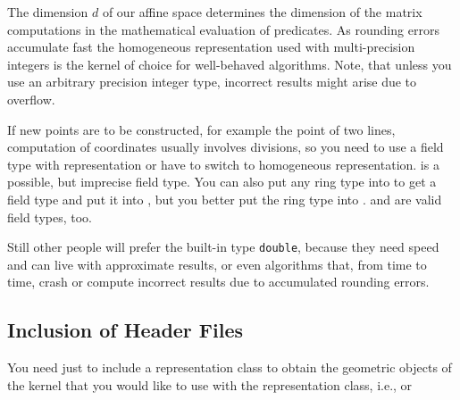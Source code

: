 The dimension $d$ of our affine space determines the dimension of the
matrix computations in the mathematical evaluation of predicates.  As
rounding errors accumulate fast the homogeneous representation used
with multi-precision integers is the kernel of choice for well-behaved
algorithms.  Note, that unless you use an arbitrary precision integer
type, incorrect results might arise due to overflow.

If new points are to be constructed, for example the
 point of two lines, computation of
 coordinates usually involves divisions,
so you need to use a field type with 
representation or have to switch to homogeneous representation.
 is a possible, but imprecise field type.  You can also
put any ring type into  to get a field type and put it
into , but you better put the ring type into
.   and  are valid
field types, too.

Still other people will prefer the built-in type {\tt double}, because
they need speed and can live with approximate results, or even
algorithms that, from time to time, crash or compute incorrect results
due to accumulated rounding errors.

\subsection{Inclusion of Header Files}

You need just to include a representation class to obtain the
geometric objects of the kernel that you would like to use with the
representation class, i.e.,  or


